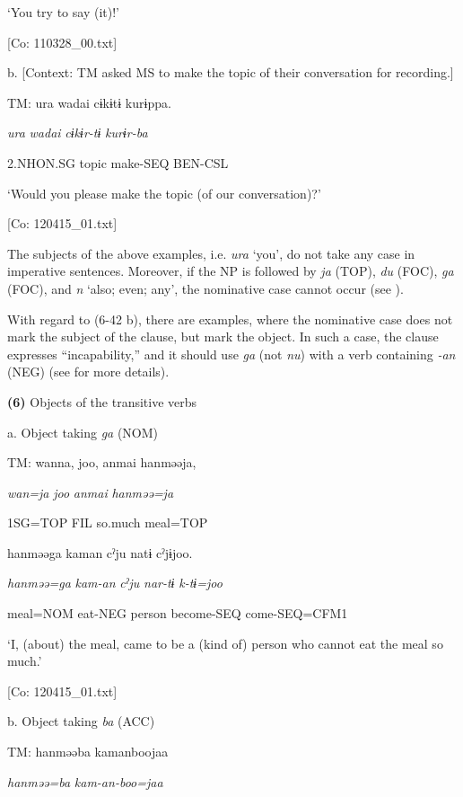       ‘You try to say (it)!’

      [Co: 110328\_00.txt]

  b.  [Context: TM asked MS to make the topic of their conversation for recording.]

    TM:  ura  {\textbar}wadai{\textbar}  cɨkɨtɨ  kurɨppa.

      \textit{ura}  \textit{wadai}  \textit{cɨkɨr-tɨ}  \textit{kurɨr-ba}

      2.NHON.SG  topic  make-SEQ  BEN-CSL

      ‘Would you please make the topic (of our conversation)?’

      [Co: 120415\_01.txt]

The subjects of the above examples, i.e. \textit{ura} ‘you’, do not take any case in imperative sentences. Moreover, if the NP is followed by \textit{ja} (TOP), \textit{du} (FOC), \textit{ga} (FOC), and \textit{n} ‘also; even; any’, the nominative case cannot occur (see ).

  With regard to (6-42 b), there are examples, where the nominative case does not mark the subject of the clause, but mark the object. In such a case, the clause expresses “incapability,” and it should use \textit{ga} (not \textit{nu}) with a verb containing \textit{{}-an} (NEG) (see  for more details).

\textbf{(6)}  Objects of the transitive verbs

  a.  Object taking \textit{ga} (NOM)

    TM:  wanna,  joo,  anmai  hanməəja,

      \textit{wan=ja}  \textit{joo}  \textit{anmai}  \textit{hanməə=ja}

      1SG=TOP  FIL  so.much  meal=TOP

      hanməəga  kaman  cˀju  natɨ  cˀjɨjoo.

      \textit{hanməə=ga}  \textit{kam-an}  \textit{cˀju}  \textit{nar-tɨ}  \textit{k-tɨ=joo}

      meal=NOM  eat-NEG  person  become-SEQ  come-SEQ=CFM1

      ‘I, (about) the meal, came to be a (kind of) person who cannot eat the meal so much.’

      [Co: 120415\_01.txt]

  b.  Object taking \textit{ba} (ACC)

    TM:  hanməəba  kamanboojaa

      \textit{hanməə=ba}  \textit{kam-an-boo=jaa}


